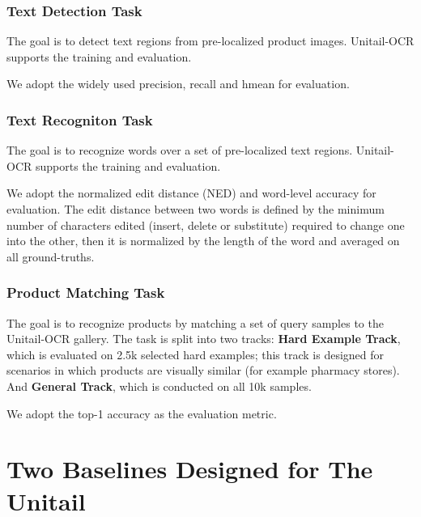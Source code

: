 \documentclass[runningheads]{llncs}
\begin{document}
\subsubsection{Text Detection Task}
The goal is to detect text regions from pre-localized product images. Unitail-OCR supports the training and evaluation.

We adopt the widely used precision, recall and hmean \cite{ICDAR15,ctw1500} for evaluation. 

\subsubsection{Text Recogniton Task}
The goal is to recognize words over a set of pre-localized text regions. Unitail-OCR supports the training and evaluation.

We adopt the normalized edit distance (NED) \cite{icdar2013} and word-level accuracy for evaluation. The edit distance between two words is defined by the minimum number of characters edited (insert, delete or substitute) required to change one into the other, then it is normalized by the length of the word and averaged on all ground-truths.

\subsubsection{Product Matching Task} 
The goal is to recognize products by matching a set of query samples to the Unitail-OCR gallery. The task is split into two tracks: \textbf{Hard Example Track}, which is evaluated on 2.5k selected hard examples; this track is designed for scenarios in which products are visually similar (for example pharmacy stores). And \textbf{General Track}, which is conducted on all 10k samples. 

We adopt the top-1 accuracy as the evaluation metric.

\section{Two Baselines Designed for The Unitail}
\end{document}
